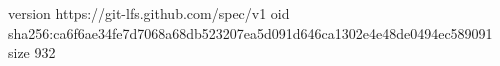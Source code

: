 version https://git-lfs.github.com/spec/v1
oid sha256:ca6f6ae34fe7d7068a68db523207ea5d091d646ca1302e4e48de0494ec589091
size 932
